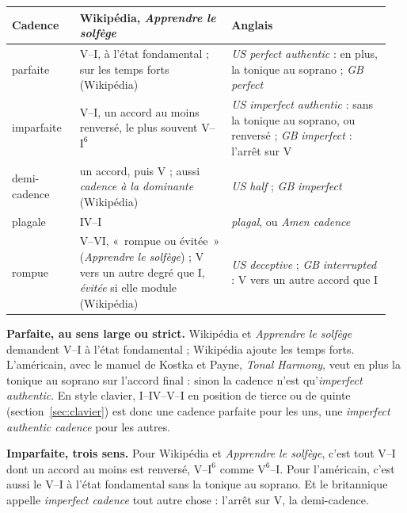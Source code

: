 \documentclass[a4paper,11pt]{article}
\newcommand{\ch}[3]{\ensuremath{\mathrm{#1}^{#2}_{#3}}}
\begin{document}
\par\medskip\noindent
\begin{minipage}{\linewidth}
\centering\small
\renewcommand{\arraystretch}{1.25}
\begin{tabular}{@{}p{0.17\linewidth} p{0.38\linewidth} p{0.4\linewidth}@{}}
\toprule
\textbf{Cadence} & \textbf{Wikipédia, \emph{Apprendre le solfège}}
  & \textbf{Anglais} \\
\midrule
parfaite & V--I, à l'état fondamental ; sur les temps forts (Wikipédia)
  & \emph{US} \emph{perfect authentic} : en plus, la tonique au soprano ;
  \emph{GB} \emph{perfect} \\
imparfaite & V--I, un accord au moins renversé, le plus souvent
  V--\ch{I}{6}{} & \emph{US} \emph{imperfect authentic} : sans la tonique au
  soprano, ou renversé ; \emph{GB} \emph{imperfect} : l'arrêt sur V \\
demi-cadence & un accord, puis V ; aussi \emph{cadence à la dominante}
  (Wikipédia) & \emph{US} \emph{half} ; \emph{GB} \emph{imperfect} \\
plagale & IV--I & \emph{plagal}, ou \emph{Amen cadence} \\
rompue & V--VI, «~rompue ou évitée~» (\emph{Apprendre le solfège}) ; V vers
  un autre degré que I, \emph{évitée} si elle module (Wikipédia)
  & \emph{US} \emph{deceptive} ; \emph{GB} \emph{interrupted} : V vers un
  autre accord que I \\
\bottomrule
\end{tabular}
\end{minipage}\par\medskip

\textbf{Parfaite, au sens large ou strict.} Wikipédia et \emph{Apprendre le
solfège} demandent V--I à l'état fondamental ; Wikipédia ajoute les temps
forts. L'américain, avec le manuel de Kostka et Payne, \emph{Tonal Harmony},
veut en plus la tonique au soprano sur l'accord final : sinon la cadence n'est
qu'\emph{imperfect authentic}. En style clavier, I--IV--V--I en position de
tierce ou de quinte (section~\ref{sec:clavier}) est donc une cadence parfaite
pour les uns, une \emph{imperfect authentic cadence} pour les autres.

\textbf{Imparfaite, trois sens.} Pour Wikipédia et \emph{Apprendre le
solfège}, c'est tout V--I dont un accord au moins est renversé, V--\ch{I}{6}{}
comme \ch{V}{6}{}--I. Pour l'américain, c'est aussi le V--I à l'état
fondamental sans la tonique au soprano. Et le britannique appelle
\emph{imperfect cadence} tout autre chose : l'arrêt sur V, la demi-cadence.
\end{document}
